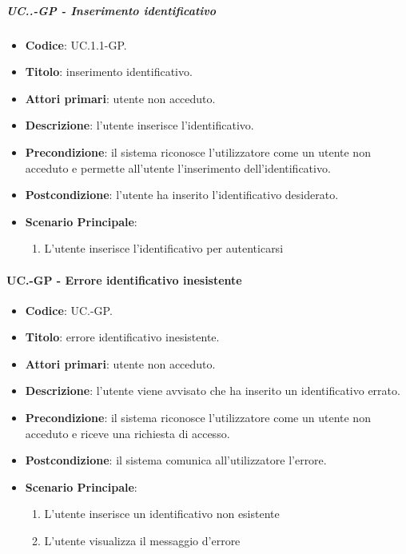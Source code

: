 		\subparagraph{UC\theuccount.\thesubuccount.\thesubsubuccount-GP - Inserimento identificativo}
			\begin{itemize}
				\item \textbf{Codice}: UC\theuccount.1.1-GP.
				\item \textbf{Titolo}: inserimento identificativo.
				\item \textbf{Attori primari}: utente non acceduto.
				\item \textbf{Descrizione}: l'utente inserisce l'identificativo.
				\item \textbf{Precondizione}: il sistema riconosce l'utilizzatore come un utente non acceduto e permette all'utente l'inserimento dell'identificativo.
				\item \textbf{Postcondizione}: l'utente ha inserito l'identificativo desiderato.
				\item \textbf{Scenario Principale}:
				\begin{enumerate}
					\item L'utente inserisce l'identificativo per autenticarsi
				\end{enumerate}
			\end{itemize}
	
	\paragraph{UC\theuccount.\thesubuccount-GP - Errore identificativo inesistente}
		\begin{itemize}
			\item \textbf{Codice}: UC\theuccount.\thesubuccount-GP.
			\item \textbf{Titolo}: errore identificativo inesistente.
			\item \textbf{Attori primari}: utente non acceduto.
			\item \textbf{Descrizione}: l'utente viene avvisato che ha inserito un identificativo errato.
			\item \textbf{Precondizione}: il sistema riconosce l'utilizzatore come un utente non acceduto e riceve una richiesta di accesso. 
			\item \textbf{Postcondizione}: il sistema comunica all'utilizzatore l'errore.
			\item \textbf{Scenario Principale}:
			\begin{enumerate}
				\item L'utente inserisce un identificativo non esistente
				\item L'utente visualizza il messaggio d'errore
			\end{enumerate}
		\end{itemize}
